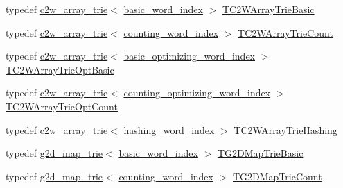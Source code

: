 \begin{DoxyCompactItemize}
\item 
typedef \hyperlink{classuva_1_1smt_1_1bpbd_1_1server_1_1lm_1_1c2w__array__trie}{c2w\+\_\+array\+\_\+trie}$<$ \hyperlink{classuva_1_1smt_1_1bpbd_1_1server_1_1lm_1_1dictionary_1_1basic__word__index}{basic\+\_\+word\+\_\+index} $>$ \hyperlink{namespaceuva_1_1smt_1_1bpbd_1_1server_1_1lm_a66cae3aa9ccc8f9b7ca88c4cc9d06a1a}{T\+C2\+W\+Array\+Trie\+Basic}
\item 
typedef \hyperlink{classuva_1_1smt_1_1bpbd_1_1server_1_1lm_1_1c2w__array__trie}{c2w\+\_\+array\+\_\+trie}$<$ \hyperlink{classuva_1_1smt_1_1bpbd_1_1server_1_1lm_1_1dictionary_1_1counting__word__index}{counting\+\_\+word\+\_\+index} $>$ \hyperlink{namespaceuva_1_1smt_1_1bpbd_1_1server_1_1lm_aecaa405295396773088ff3a8e905a060}{T\+C2\+W\+Array\+Trie\+Count}
\item 
typedef \hyperlink{classuva_1_1smt_1_1bpbd_1_1server_1_1lm_1_1c2w__array__trie}{c2w\+\_\+array\+\_\+trie}$<$ \hyperlink{namespaceuva_1_1smt_1_1bpbd_1_1server_1_1lm_1_1dictionary_a3001583c904eec702b4a4125082a7ecd}{basic\+\_\+optimizing\+\_\+word\+\_\+index} $>$ \hyperlink{namespaceuva_1_1smt_1_1bpbd_1_1server_1_1lm_aa97ceb9b76e43af0e1ce7c23eed23432}{T\+C2\+W\+Array\+Trie\+Opt\+Basic}
\item 
typedef \hyperlink{classuva_1_1smt_1_1bpbd_1_1server_1_1lm_1_1c2w__array__trie}{c2w\+\_\+array\+\_\+trie}$<$ \hyperlink{namespaceuva_1_1smt_1_1bpbd_1_1server_1_1lm_1_1dictionary_a61cbd647b15de785ccf4cdd26661c366}{counting\+\_\+optimizing\+\_\+word\+\_\+index} $>$ \hyperlink{namespaceuva_1_1smt_1_1bpbd_1_1server_1_1lm_a3f802fb919db16970d4112d79cb94957}{T\+C2\+W\+Array\+Trie\+Opt\+Count}
\item 
typedef \hyperlink{classuva_1_1smt_1_1bpbd_1_1server_1_1lm_1_1c2w__array__trie}{c2w\+\_\+array\+\_\+trie}$<$ \hyperlink{classuva_1_1smt_1_1bpbd_1_1server_1_1lm_1_1dictionary_1_1hashing__word__index}{hashing\+\_\+word\+\_\+index} $>$ \hyperlink{namespaceuva_1_1smt_1_1bpbd_1_1server_1_1lm_a4ce1cd1267b5073068ef3c26f760c950}{T\+C2\+W\+Array\+Trie\+Hashing}
\item 
typedef \hyperlink{classuva_1_1smt_1_1bpbd_1_1server_1_1lm_1_1g2d__map__trie}{g2d\+\_\+map\+\_\+trie}$<$ \hyperlink{classuva_1_1smt_1_1bpbd_1_1server_1_1lm_1_1dictionary_1_1basic__word__index}{basic\+\_\+word\+\_\+index} $>$ \hyperlink{namespaceuva_1_1smt_1_1bpbd_1_1server_1_1lm_a6fa183ee690c48a8ae4a1833aaa02dc6}{T\+G2\+D\+Map\+Trie\+Basic}
\item 
typedef \hyperlink{classuva_1_1smt_1_1bpbd_1_1server_1_1lm_1_1g2d__map__trie}{g2d\+\_\+map\+\_\+trie}$<$ \hyperlink{classuva_1_1smt_1_1bpbd_1_1server_1_1lm_1_1dictionary_1_1counting__word__index}{counting\+\_\+word\+\_\+index} $>$ \hyperlink{namespaceuva_1_1smt_1_1bpbd_1_1server_1_1lm_a2e185a93cd3a0d6a1dda4362ba9001cb}{T\+G2\+D\+Map\+Trie\+Count}

\end{DoxyCompactItemize}
